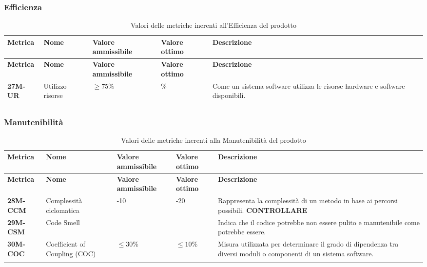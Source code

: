 \subsubsection{Efficienza}
	\begin{longtable}{|>{\centering\arraybackslash}p{}|>{\centering\arraybackslash}p{}|>{\centering\arraybackslash}p{}|>{\centering\arraybackslash}p{}|>{\centering\arraybackslash}p{}|}
    \hline
    \textbf{Metrica} & \textbf{Nome} & \textbf{Valore ammissibile} & \textbf{Valore ottimo}& \textbf{Descrizione}\\
	\hline
    \endfirsthead
    \hline
    \textbf{Metrica} & \textbf{Nome} & \textbf{Valore ammissibile} & \textbf{Valore ottimo}& \textbf{Descrizione}\\
    \endhead
	\textbf{27M-UR} & Utilizzo risorse & $\geq 75\% $  & 100\% & Come un sistema software utilizza le risorse hardware e software disponibili.\\
	\hline
	\caption{ Valori delle metriche inerenti all'Efficienza del prodotto}
	\label{table:10}
	\end{longtable}
\subsubsection{Manutenibilità}
\begin{longtable}{|>{\centering\arraybackslash}p{}|>{\centering\arraybackslash}p{}|>{\centering\arraybackslash}p{}|>{\centering\arraybackslash}p{}|>{\centering\arraybackslash}p{}|}
    \hline
    \textbf{Metrica} & \textbf{Nome} & \textbf{Valore ammissibile} & \textbf{Valore ottimo}& \textbf{Descrizione}\\
	\hline
    \endfirsthead
    \hline
    \textbf{Metrica} & \textbf{Nome} & \textbf{Valore ammissibile} & \textbf{Valore ottimo}& \textbf{Descrizione}\\
    \endhead
	\textbf{28M-CCM} & Complessità ciclomatica & 1-10 & 11-20 & Rappresenta la complessità di un metodo in base ai percorsi possibili. \textbf{CONTROLLARE}\\
	\hline
	\textbf{29M-CSM} & Code Smell & 0 & 0 & Indica che il codice potrebbe non essere pulito e manutenibile come potrebbe essere.\\ 
	\hline
	\textbf{30M-COC} & Coefficient of Coupling (COC) & $\leq 30\% $ & $\leq 10\% $ & Misura utilizzata per determinare il grado di dipendenza tra diversi moduli o componenti di un sistema software.\\ 
	\hline
	\caption{ Valori delle metriche inerenti alla Manutenibilità del prodotto}
	\label{table:11}
\end{longtable}